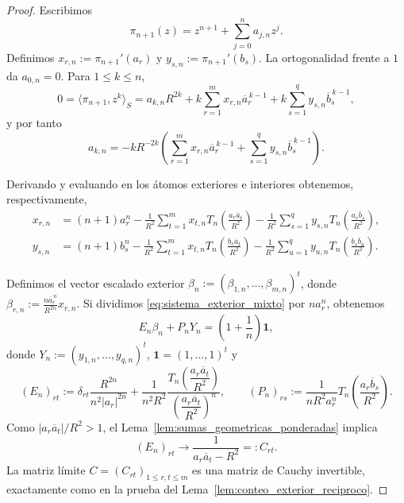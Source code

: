 \begin{proof}
	Escribimos
	\[
		\pi_{n+1}(z)=z^{n+1}+\sum_{j=0}^n a_{j,n}z^j.
	\]
	Definimos $x_{r,n}:=\pi_{n+1}'(a_r)$ y $y_{s,n}:=\pi_{n+1}'(b_s)$.
	La ortogonalidad frente a $1$ da $a_{0,n}=0$. Para $1\le k\le n$,
	\[
		0=\langle \pi_{n+1},z^k\rangle_S
		=a_{k,n}R^{2k}+k\sum_{r=1}^m x_{r,n}\overline a_r^{\,k-1}+k\sum_{s=1}^q y_{s,n}\overline b_s^{\,k-1},
	\]
	y por tanto
	\begin{equation}\label{eq:coeficientes_mixto_sin_frontera}
		a_{k,n}=-kR^{-2k}\left(\sum_{r=1}^m x_{r,n}\overline a_r^{\,k-1}+\sum_{s=1}^q y_{s,n}\overline b_s^{\,k-1}\right).
	\end{equation}

	Derivando y evaluando en los átomos exteriores e interiores obtenemos, respectivamente,
	\begin{align}
		x_{r,n}
		 & =(n+1)a_r^n
		-\frac1{R^2}\sum_{t=1}^m x_{t,n}T_n\!\left(\frac{a_r\overline a_t}{R^2}\right)
		-\frac1{R^2}\sum_{s=1}^q y_{s,n}T_n\!\left(\frac{a_r\overline b_s}{R^2}\right),
		\label{eq:sistema_exterior_mixto}
		\\
		y_{s,n}
		 & =(n+1)b_s^n
		-\frac1{R^2}\sum_{t=1}^m x_{t,n}T_n\!\left(\frac{b_s\overline a_t}{R^2}\right)
		-\frac1{R^2}\sum_{u=1}^q y_{u,n}T_n\!\left(\frac{b_s\overline b_u}{R^2}\right).
		\label{eq:sistema_interior_mixto}
	\end{align}

	Definimos el vector escalado exterior $\beta_n:=(\beta_{1,n},\dots,\beta_{m,n})^t$, donde $\beta_{r,n}:=\frac{n\overline a_r^{\,n}}{R^{2n}}x_{r,n}$.
	Si dividimos \eqref{eq:sistema_exterior_mixto} por $na_r^n$, obtenemos
	\begin{equation}\label{eq:sistema_exterior_beta_mixto}
		E_n\beta_n+P_nY_n=\left(1+\frac1n\right)\mathbf 1,
	\end{equation}
	donde $Y_n:=(y_{1,n},\dots,y_{q,n})^t$, $\mathbf 1=(1,\dots,1)^t$ y
	\[
		(E_n)_{rt}
		:=
		\delta_{rt}\frac{R^{2n}}{n^2|a_r|^{2n}}
		+
		\frac{1}{n^2R^2}
		\frac{T_n\!\left(\dfrac{a_r\overline a_t}{R^2}\right)}{\left(\dfrac{a_r\overline a_t}{R^2}\right)^n},
		\qquad
		(P_n)_{rs}
		:=
		\frac{1}{nR^2a_r^n}
		T_n\!\left(\frac{a_r\overline b_s}{R^2}\right).
	\]
	Como $|a_r\overline a_t|/R^2>1$, el Lema~\ref{lem:sumas_geometricas_ponderadas} implica
	\[
		(E_n)_{rt}\longrightarrow \frac{1}{a_r\overline a_t-R^2}=:C_{rt}.
	\]
	La matriz límite $C=(C_{rt})_{1\le r,t\le m}$ es una matriz de Cauchy invertible, exactamente como en la prueba del Lema~\ref{lem:conteo_exterior_reciproco}.


\end{proof}
